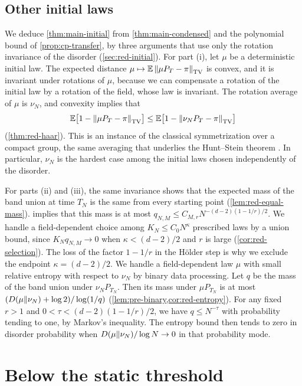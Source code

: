 \subsection{Other initial laws}\label{sec:ov-initial}

We deduce \cref{thm:main-initial} from \cref{thm:main-condensed} and the polynomial bound of \cref{prop:cp-transfer}, by three arguments that use only the rotation invariance of the disorder (\cref{sec:red-initial}). For part (i), let $\mu$ be a deterministic initial law. The expected distance $\mu\mapsto\mathbb E\left\lVert\mu P_T-\pi\right\rVert_{\mathrm{TV}}$ is convex, and it is invariant under rotations of $\mu$, because we can compensate a rotation of the initial law by a rotation of the field, whose law is invariant. The rotation average of $\mu$ is $\nu_N$, and convexity implies that
\begin{equation}\label{eq:ov-haar}
\mathbb E\bigl[1-\left\lVert\mu P_T-\pi\right\rVert_{\mathrm{TV}}\bigr]\le\mathbb E\bigl[1-\left\lVert\nu_NP_T-\pi\right\rVert_{\mathrm{TV}}\bigr]
\end{equation}
(\cref{thm:red-haar}). This is an instance of the classical symmetrization over a compact group, the same averaging that underlies the Hunt--Stein theorem \cite[Section~8.5]{LehmannRomano2005}. In particular, $\nu_N$ is the hardest case among the initial laws chosen independently of the disorder.

For parts (ii) and (iii), the same invariance shows that the expected mass of the band union at time $T_N$ is the same from every starting point (\cref{lem:red-equal-mass}).  implies that this mass is at most $q_{N,M}\le C_{M,r}N^{-(d-2)(1-1/r)/2}$. We handle a field-dependent choice among $K_N\le C_0N^\kappa$ prescribed laws by a union bound, since $K_Nq_{N,M}\to0$ when $\kappa<(d-2)/2$ and $r$ is large (\cref{cor:red-selection}). The loss of the factor $1-1/r$ in the H\"older step is why we exclude the endpoint $\kappa=(d-2)/2$. We handle a field-dependent law $\mu$ with small relative entropy with respect to $\nu_N$ by binary data processing. Let $q$ be the mass of the band union under $\nu_NP_{T_N}$. Then its mass under $\mu P_{T_N}$ is at most $(D(\mu\Vert\nu_N)+\log2)/\log(1/q)$ (\cref{lem:pre-binary,cor:red-entropy}). For any fixed $r>1$ and $0<\tau<(d-2)(1-1/r)/2$, we have $q\le N^{-\tau}$ with probability tending to one, by Markov's inequality. The entropy bound then tends to zero in disorder probability when $D(\mu\Vert\nu_N)/\log N\to0$ in that probability mode.

\section{Below the static threshold}\label{sec:ov-prestatic}

